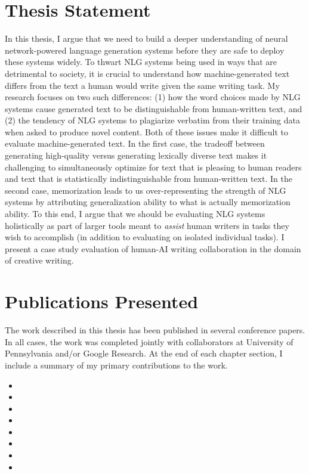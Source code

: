 \section{Thesis Statement}
In this thesis, I argue that we need to build a deeper understanding of neural network-powered language generation systems before they are safe to deploy these systems widely.
To thwart NLG systems being used in ways that are detrimental to society, it is crucial to understand how machine-generated text differs from the text a human would write given the same writing task.
My research focuses on two such differences: (1) how the word choices made by NLG systems cause generated text to be distinguishable from human-written text, and (2) the tendency of NLG systems to plagiarize verbatim from their training data when asked to produce novel content.
Both of these issues make it difficult to evaluate machine-generated text.
In the first case, the tradeoff between generating high-quality versus generating lexically diverse text makes it challenging to simultaneously optimize for text that is pleasing to human readers and text that is statistically indistinguishable from human-written text.
In the second case, memorization leads to us over-representing the strength of NLG systems by attributing generalization ability to what is actually memorization ability.
To this end, I argue that we should be evaluating NLG systems holistically as part of larger tools meant to \textit{assist} human writers in tasks they wish to accomplish (in addition to evaluating on isolated individual tasks).
I present a case study evaluation of human-AI writing collaboration in the domain of creative writing.

\section{Publications Presented}
The work described in this thesis has been published in several conference papers. In all cases, the work was completed jointly with collaborators at University of Pennsylvania and/or Google Research.
At the end of each chapter section, I include a summary of my primary contributions to the work.

\begin{itemize}
  \item {}
  \item {}
  \item {}
  \item {}
  \item {}
  \item {}
  \item {}
  \item {}
\end{itemize}


